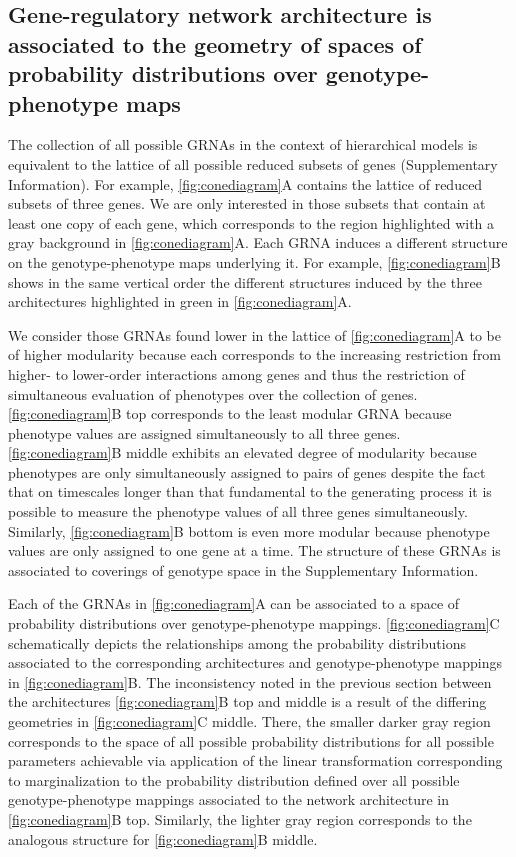 \subsection{Gene-regulatory network architecture is associated to the geometry of spaces of probability distributions over genotype-phenotype maps}
The collection of all possible GRNAs in the context of hierarchical models is equivalent to the lattice of all possible reduced subsets of genes (Supplementary Information). For example, \ref{fig:conediagram}A contains the lattice of reduced subsets of three genes. We are only interested in those subsets that contain at least one copy of each gene, which corresponds to the region highlighted with a gray background in \ref{fig:conediagram}A. Each GRNA induces a different structure on the genotype-phenotype maps underlying it. For example, \ref{fig:conediagram}B shows in the same vertical order the different structures induced by the three architectures highlighted in green in \ref{fig:conediagram}A.

We consider those GRNAs found lower in the lattice of \ref{fig:conediagram}A to be of higher modularity because each corresponds to the increasing restriction from higher- to lower-order interactions among genes and thus the restriction of simultaneous evaluation of phenotypes over the collection of genes. \ref{fig:conediagram}B top corresponds to the least modular GRNA because phenotype values are assigned simultaneously to all three genes. \ref{fig:conediagram}B middle exhibits an elevated degree of modularity because phenotypes are only simultaneously assigned to pairs of genes despite the fact that on timescales longer than that fundamental to the generating process it is possible to measure the phenotype values of all three genes simultaneously. Similarly, \ref{fig:conediagram}B bottom is even more modular because phenotype values are only assigned to one gene at a time. The structure of these GRNAs is associated to coverings of genotype space in the Supplementary Information.

Each of the GRNAs in \ref{fig:conediagram}A can be associated to a space of probability distributions over genotype-phenotype mappings. \ref{fig:conediagram}C schematically depicts the relationships among the probability distributions associated to the corresponding architectures and genotype-phenotype mappings in \ref{fig:conediagram}B. The inconsistency noted in the previous section between the architectures \ref{fig:conediagram}B top and middle is a result of the differing geometries in \ref{fig:conediagram}C middle. There, the smaller darker gray region corresponds to the space of all possible probability distributions for all possible parameters achievable via application of the linear transformation corresponding to marginalization to the probability distribution defined over all possible genotype-phenotype mappings associated to the network architecture in \ref{fig:conediagram}B top. Similarly, the lighter gray region corresponds to the analogous structure for \ref{fig:conediagram}B middle.

